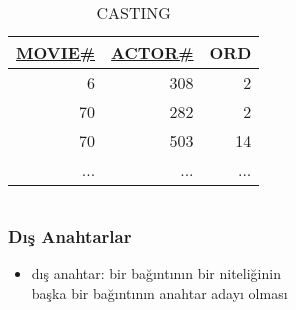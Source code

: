 \documentclass[dvipsnames]{beamer}
\theoremstyle{plain}
\begin{document}
\begin{frame}
\begin{columns}[t]
    \begin{footnotesize}
    \begin{table}
      \caption{CASTING}
      \begin{tabular}{|r|r|r|}\hline
\underline{MOVIE\#} & \underline{ACTOR\#} & ORD\\[2pt]\hline\hline
                  6 &                 308 &   2\\\hline
                 70 &                 282 &   2\\\hline
                 70 &                 503 &  14\\\hline
                ... &                 ... & ...\\\hline
      \end{tabular}
    \end{table}
    \end{footnotesize}
  \end{columns}
\end{frame}

\begin{frame}
  \frametitle{Dış Anahtarlar}

  \begin{itemize}
   \item \alert{dış anahtar}: bir bağıntının bir niteliğinin\\
      başka bir bağıntının anahtar adayı olması
  \end{itemize}
\end{frame}
\end{document}
